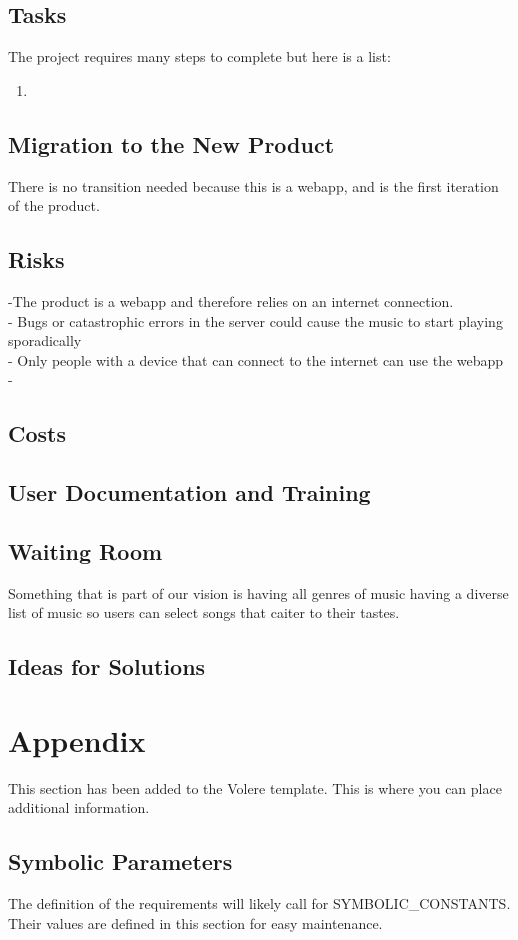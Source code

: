\documentclass[12pt, titlepage]{article}
\begin{document}
\subsection{Tasks}
The project requires many steps to complete but here is a list:
\begin{enumerate}
\item 
\end{enumerate}
\subsection{Migration to the New Product}
There is no transition needed because this is a webapp, and is the first iteration of the product.
\subsection{Risks}
-The product is a webapp and therefore relies on an internet connection. \\
- Bugs or catastrophic errors in the server could cause the music to start
  playing sporadically \\
- Only people with a device that can connect to the internet can use the webapp\\
- 

\subsection{Costs}

\subsection{User Documentation and Training}

\subsection{Waiting Room}
Something that is part of our vision is having all genres of music having a diverse list of music so users can select songs that caiter to their tastes.
\subsection{Ideas for Solutions}





\newpage

\section{Appendix}

This section has been added to the Volere template.  This is where you can place
additional information.

\subsection{Symbolic Parameters}

The definition of the requirements will likely call for SYMBOLIC\_CONSTANTS.
Their values are defined in this section for easy maintenance.
\end{document}
